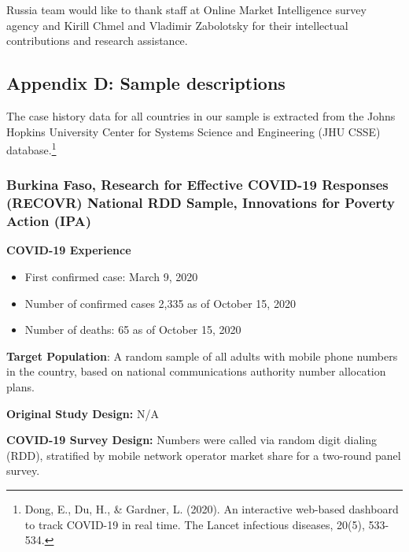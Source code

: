 \documentclass[
  12pt,
]{article}
\begin{document}
Russia team would like to thank staff at Online Market Intelligence survey agency and Kirill Chmel and Vladimir Zabolotsky for their intellectual contributions and research assistance.

\newpage

\hypertarget{appendixa}{%
\subsection*{Appendix D: Sample descriptions}\label{appendixa}}

The case history data for all countries in our sample is extracted from the Johns Hopkins University Center for Systems Science and Engineering (JHU CSSE) database.\footnote{Dong, E., Du, H., \& Gardner, L. (2020). An interactive web-based dashboard to track COVID-19 in real time. The Lancet infectious diseases, 20(5), 533-534.}

\hypertarget{burkina-faso-research-for-effective-covid-19-responses-recovr-national-rdd-sample-innovations-for-poverty-action-ipa}{%
\subsubsection*{Burkina Faso, Research for Effective COVID-19 Responses (RECOVR) National RDD Sample, Innovations for Poverty Action (IPA)}\label{burkina-faso-research-for-effective-covid-19-responses-recovr-national-rdd-sample-innovations-for-poverty-action-ipa}}

\textbf{COVID-19 Experience}

\begin{itemize}
\item First confirmed case: March 9, 2020 
\item Number of confirmed cases 2,335 as of  October 15, 2020 
\item Number of deaths:  65 as of October 15, 2020
\end{itemize}

\textbf{Target Population}: A random sample of all adults with mobile phone numbers in the country, based on national communications authority number allocation plans.

\textbf{Original Study Design:} N/A

\textbf{COVID-19 Survey Design:} Numbers were called via random digit dialing (RDD), stratified by mobile network operator market share for a two-round panel survey.
\end{document}
